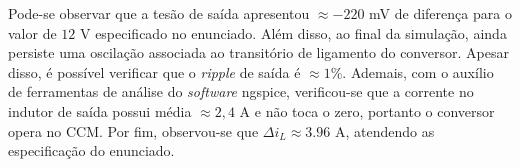 Pode-se observar que a tesão de saída apresentou $\approx -220$ mV de diferença para o valor de $12$ V especificado no enunciado. Além disso, ao final da simulação, ainda persiste uma oscilação associada ao transitório de ligamento do conversor. Apesar disso, é possível verificar que o \textit{ripple} de saída é $\approx 1$\%. Ademais, com o auxílio de ferramentas de análise do \textit{software} ngspice, verificou-se que a corrente no indutor de saída possui média $ \approx 2{,}4$ A e não toca o zero, portanto o conversor opera no CCM. Por fim, observou-se que $\Delta i_L \approx 3.96$ A, atendendo as especificação do enunciado.